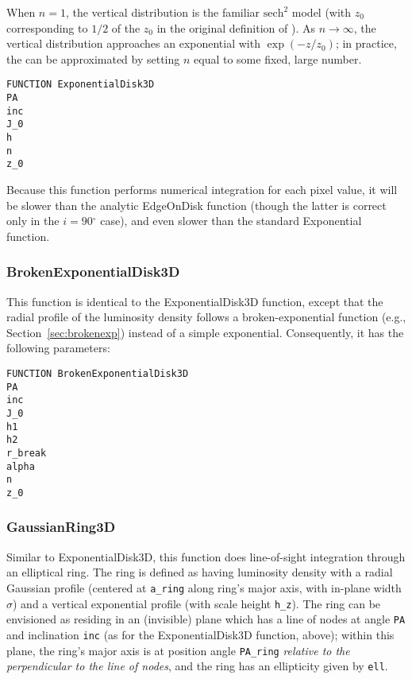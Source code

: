 \documentclass[10pt,a4paper,article]{memoir}
\newcommand{\arcdeg}{\ensuremath{^{\circ}}}
\begin{document}
When $n = 1$, the vertical distribution is the familiar $\mathrm{sech}^2$ model
(with $z_{0}$ corresponding to $1/2$ of the $z_0$ in the original definition of
\citet{vdk81}). As $n \rightarrow \infty$, the vertical distribution approaches
an exponential with $\exp(-z/z_{0})$; in practice, the can be approximated by
setting $n$ equal to some fixed, large number.


\begin{verbatim}
FUNCTION ExponentialDisk3D
PA
inc
J_0
h
n
z_0
\end{verbatim}

Because this function performs numerical integration for each pixel value, it will be
slower than the analytic EdgeOnDisk function (though the latter is correct only in
the $i= 90\arcdeg$ case), and even slower than the standard Exponential function.



\subsubsection{BrokenExponentialDisk3D}

This function is identical to the ExponentialDisk3D function, except that the radial
profile of the luminosity density follows a broken-exponential function (e.g., Section~\ref{sec:brokenexp})
instead of a simple exponential. Consequently, it has the following parameters:

\begin{verbatim}
FUNCTION BrokenExponentialDisk3D
PA
inc
J_0
h1
h2
r_break
alpha
n
z_0
\end{verbatim}




\subsubsection{GaussianRing3D}

Similar to ExponentialDisk3D, this function does line-of-sight integration
through an elliptical ring.  The ring is defined as having luminosity density
with a radial Gaussian profile (centered at \texttt{a\_ring} along ring's major
axis, with in-plane width $\sigma$) and a vertical exponential profile
(with scale height \texttt{h\_z}). The ring can be envisioned as residing in an
(invisible) plane which has a line of nodes at angle \texttt{PA} and inclination
\texttt{inc} (as for the ExponentialDisk3D function, above); within this plane,
the ring's major axis is at position angle \texttt{PA\_ring} \textit{relative to
the perpendicular to the line of nodes}, and the ring has an ellipticity given
by \texttt{ell}.
\end{document}
